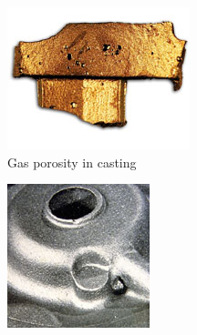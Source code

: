 \begin{figure}[htbp] %
\centering
  \begin{subfigure}[t]{0.3\textwidth}
    \centering
	\includegraphics[width=\textwidth]{Chapter0/Graphics/porosity1.jpg}
	\caption{Gas porosity in casting}
    \label{fig:porosity1}
  \end{subfigure}
   \hspace{1cm}
   \begin{subfigure}[t]{0.25\textwidth}
    \centering
	\includegraphics[width=\textwidth]{Chapter0/Graphics/porosity2.jpg}

\end{subfigure}
\end{figure}
